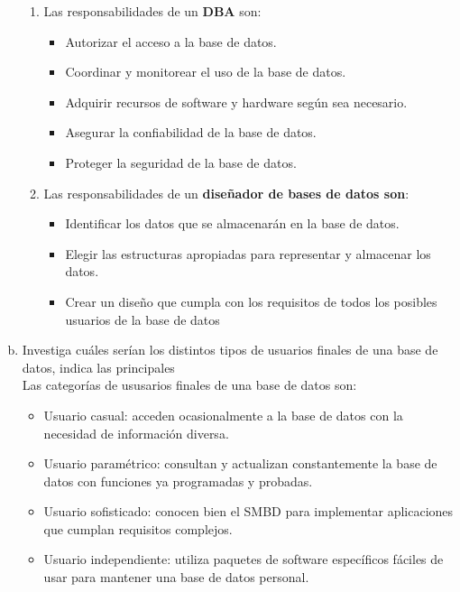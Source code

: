 \documentclass[letterpaper,12pt]{article}
\begin{document}
\begin{enumerate}[a. ]
            \begin{enumerate}
              \item Las responsabilidades de un \textbf{DBA} son:
              \begin{itemize}
                  \item Autorizar el acceso a la base de datos. 
                  \item Coordinar y monitorear el uso de la base de datos.
                  \item Adquirir recursos de software y hardware según sea necesario.
                  \item Asegurar la confiabilidad de la base de datos.
                  \item Proteger la seguridad de la base de datos.
              \end{itemize}
  
              \item Las responsabilidades de un \textbf{diseñador de bases de datos son}:
              \begin{itemize}
                  \item Identificar los datos que se almacenarán en la base de datos.
                  \item Elegir las estructuras apropiadas para representar y almacenar los datos.
                  \item Crear un diseño que cumpla con los requisitos de todos los posibles usuarios de la base de datos
              \end{itemize}  
      \end{enumerate}
            \item Investiga cuáles serían los distintos tipos de usuarios finales de una base de datos, indica las principales \\

          Las categorías de ususarios finales de una base de datos son:

        	\begin{itemize}
        		\item Usuario casual: acceden ocasionalmente a la base de datos con la necesidad de información diversa.
        		\item Usuario paramétrico: consultan y actualizan constantemente la base de datos con funciones ya programadas y probadas.
        		\item Usuario sofisticado: conocen bien el SMBD para implementar aplicaciones que cumplan requisitos complejos.
        		\item Usuario independiente: utiliza paquetes de software específicos fáciles de usar para mantener una base de datos personal.
        	\end{itemize}


\end{enumerate}
\end{document}

